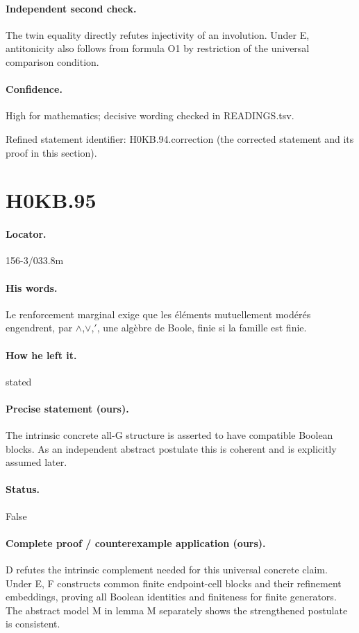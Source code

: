 \paragraph{Independent second check.} The twin equality directly refutes injectivity of an involution. Under E, antitonicity also follows from formula O1 by restriction of the universal comparison condition.

\paragraph{Confidence.} High for mathematics; decisive wording checked in READINGS.tsv.

\noindent Refined statement identifier: H0KB.94.correction (the corrected statement and its proof in this section).

\section*{H0KB.95}\label{statement:H0KB.95}
\paragraph{Locator.} 156-3/033.8m

\paragraph{His words.} Le renforcement marginal exige que les éléments mutuellement modérés engendrent, par \ensuremath{\wedge},\ensuremath{\vee},\ensuremath{\prime}, une algèbre de Boole, finie si la famille est finie.

\paragraph{How he left it.} stated

\paragraph{Precise statement (ours).} The intrinsic concrete all-G structure is asserted to have compatible Boolean blocks. As an independent abstract postulate this is coherent and is explicitly assumed later.

\paragraph{Status.} False

\paragraph{Complete proof / counterexample application (ours).} D refutes the intrinsic complement needed for this universal concrete claim. Under E, F constructs common finite endpoint-cell blocks and their refinement embeddings, proving all Boolean identities and finiteness for finite generators. The abstract model M in lemma M separately shows the strengthened postulate is consistent.

